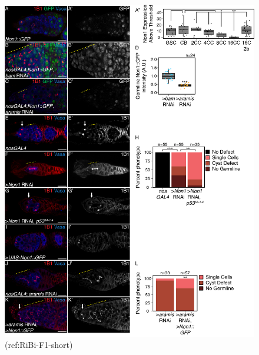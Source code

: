 \documentclass[12pt,oneside]{reedthesis}
\begin{document}
\begin{figure}

{\centering \includegraphics[width=6.5 in,height=8.9375 in]{./figure/Ribosome Biogenesis/Ribosome Biogenesis 5} 

}

\caption[(ref:RiBi-F1-short)]{(ref:RiBi-F1-short)}\label{fig:unnamed-chunk-14}
\end{figure}
\end{document}
